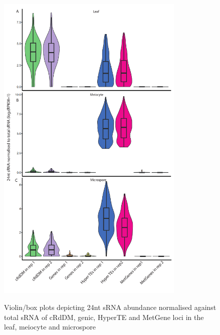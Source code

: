 \begin{figure}[htbp!] 
\centering    
    \includegraphics[width=0.8\textwidth]{Chapter2/Figs/Supps/FigureS8_boxplots_meiocyte_microspore.pdf}
\caption{Violin/box plots depicting 24nt sRNA abundance normalised against total sRNA of cRdDM, genic, HyperTE and MetGene loci in the leaf, meiocyte and microspore}
\label{fig:boxplot-MCMS}
\captionsetup{font=small}
    \caption*{}
\end{figure}

